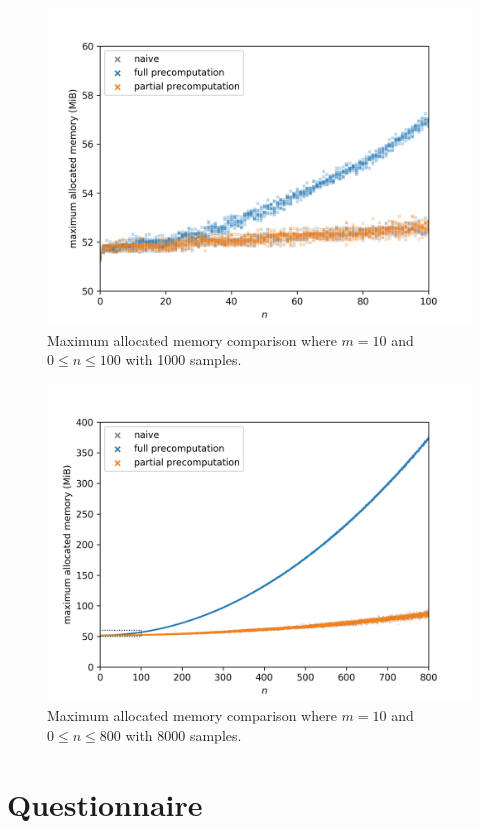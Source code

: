 \begin{figure}[H]
	\centering
	\includegraphics[scale=0.7]{figures/precomputation_memory_small}
	\caption{Maximum allocated memory comparison where $m=10$ and $0\leq n\leq 100$ with 1000 samples.}
\end{figure}

\begin{figure}[H]
	\centering
	\includegraphics[scale=0.7]{figures/precomputation_memory_big}
	\caption{Maximum allocated memory comparison where $m=10$ and $0\leq n\leq 800$ with 8000 samples.}
\end{figure}

\section{Questionnaire}

